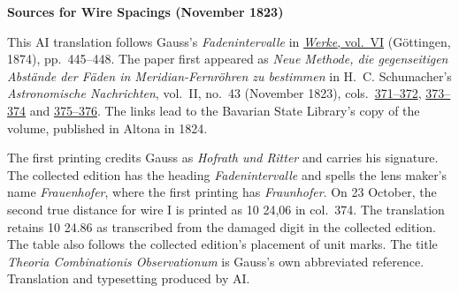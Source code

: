 \clearpage\thispagestyle{empty}
\begin{center}\textbf{Sources for Wire Spacings (November 1823)}\end{center}
\noindent This AI translation follows Gauss’s \textit{Fadenintervalle} in \href{https://gdz.sub.uni-goettingen.de/id/PPN236007467}{\textit{Werke}, vol.~VI} (Göttingen, 1874), pp.~445--448. The paper first appeared as \textit{Neue Methode, die gegenseitigen Abstände der Fäden in Meridian-Fernröhren zu bestimmen} in H.~C. Schumacher’s \textit{Astronomische Nachrichten}, vol.~II, no.~43 (November 1823), cols.~\href{https://api.digitale-sammlungen.de/iiif/image/v2/bsb10049427_00218/full/1800,/0/default.jpg}{371--372}, \href{https://api.digitale-sammlungen.de/iiif/image/v2/bsb10049427_00219/full/1800,/0/default.jpg}{373--374} and \href{https://api.digitale-sammlungen.de/iiif/image/v2/bsb10049427_00220/full/1800,/0/default.jpg}{375--376}. The links lead to the Bavarian State Library’s copy of the volume, published in Altona in 1824.
\par\smallskip\noindent The first printing credits Gauss as \textit{Hofrath und Ritter} and carries his signature. The collected edition has the heading \textit{Fadenintervalle} and spells the lens maker’s name \textit{Frauenhofer}, where the first printing has \textit{Fraunhofer}. On 23 October, the second true distance for wire I is printed as 10 24,06 in col.~374. The translation retains 10 24.86 as transcribed from the damaged digit in the collected edition. The table also follows the collected edition’s placement of unit marks. The title \textit{Theoria Combinationis Observationum} is Gauss’s own abbreviated reference. Translation and typesetting produced by AI.
\clearpage
